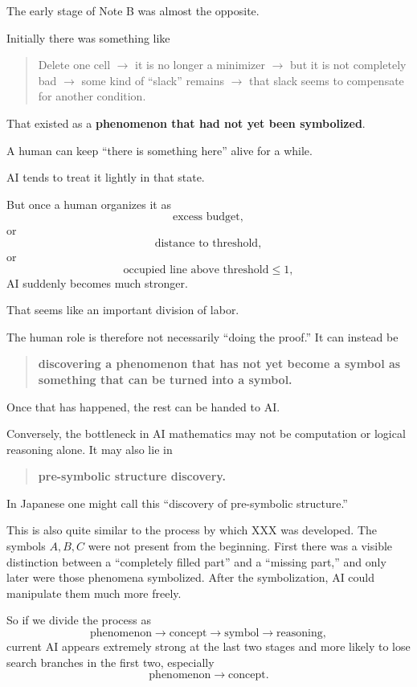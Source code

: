 \documentclass[11pt,a4paper]{article}
\begin{document}
The early stage of Note B was almost the opposite.

Initially there was something like
\begin{quote}
Delete one cell  
$\to$ it is no longer a minimizer  
$\to$ but it is not completely bad  
$\to$ some kind of “slack” remains  
$\to$ that slack seems to compensate for another condition.
\end{quote}

That existed as a \textbf{phenomenon that had not yet been symbolized}.

A human can keep “there is something here” alive for a while.

AI tends to treat it lightly in that state.

But once a human organizes it as
\[
\text{excess budget},
\]
or
\[
\text{distance to threshold},
\]
or
\[
\text{occupied line above threshold}\le1,
\]
AI suddenly becomes much stronger.

That seems like an important division of labor.

The human role is therefore not necessarily “doing the proof.” It can instead be
\begin{quote}
\textbf{discovering a phenomenon that has not yet become a symbol as something that can be turned into a symbol.}
\end{quote}

Once that has happened, the rest can be handed to AI.

Conversely, the bottleneck in AI mathematics may not be computation or logical reasoning alone. It may also lie in
\begin{quote}
\textbf{pre-symbolic structure discovery.}
\end{quote}

In Japanese one might call this “discovery of pre-symbolic structure.”

This is also quite similar to the process by which XXX was developed. The symbols \(A,B,C\) were not present from the beginning. First there was a visible distinction between a “completely filled part” and a “missing part,” and only later were those phenomena symbolized. After the symbolization, AI could manipulate them much more freely.

So if we divide the process as
\[
\text{phenomenon}
\rightarrow
\text{concept}
\rightarrow
\text{symbol}
\rightarrow
\text{reasoning},
\]
current AI appears extremely strong at the last two stages and more likely to lose search branches in the first two, especially
\[
\text{phenomenon}\rightarrow\text{concept}.
\]
\end{document}

